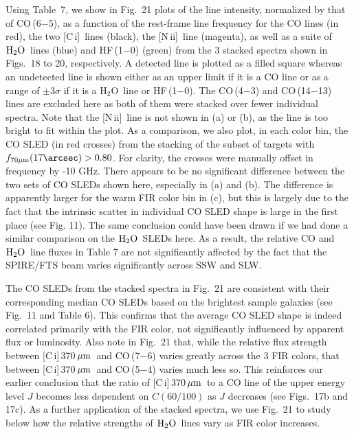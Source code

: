 \documentclass[preprint]{aastex}
\newcommand{\um}{\mbox{$\,\mu{\rm m}$}}
\newcommand{\Water}{\mbox{${\rm H}_2{\rm O}$}}
\newcommand{\CI}{[C\,{\sc i}]}
\newcommand{\NII}{\mbox{[N\,{\sc ii}]}}
\newcommand{\water}{\mbox{H$_2$O}}
\begin{document}
Using Table~7, we show in Fig.~21 plots of the line intensity, normalized by 
that of CO\,(6$-$5), as a function of the rest-frame line frequency for 
the CO lines (in red), the two \CI\ lines (black), the \NII\ line (magenta), 
as well as a suite of \Water\ lines (blue) and HF\,(1$-$0) (green) from 
the 3 stacked spectra shown in Figs.~18 to 20, respectively.  A detected line 
is plotted as a filled square whereas an undetected line is shown either 
as an upper limit if it is a CO line or as a range of $\pm$3$\sigma$ if it is
a \water\ line or HF\,(1$-$0). 
The CO\,(4$-$3) and CO\,(14$-$13) lines are excluded here as both of them were 
stacked over fewer individual spectra.  Note that the \NII\ line is not shown in
(a) or (b), as the line is too bright to fit within the plot. As a comparison,
we also plot, in each color bin, the CO SLED (in red crosses) from the stacking 
of the subset of targets with $f_{70\mu{\rm m}}(17\arcsec) > 0.80$. For clarity, 
the crosses 
were manually offset in frequency by -10 GHz.  There appears to be no significant
difference between the two sets of CO SLEDs shown here, especially in (a) 
and (b).  The difference is apparently larger for the warm FIR color bin 
in (c), but this is largely due to the fact that the intrinsic scatter in 
individual CO SLED shape is large in the first place (see Fig. 11). The same
conclusion could have been drawn if we had done a similar comparison on 
the \Water\ SLEDs here. As a result, the relative CO and \Water\ line fluxes 
in Table 7 are not significantly affected by the fact that the SPIRE/FTS beam
varies significantly across SSW and SLW.


The CO SLEDs from the stacked spectra in Fig.~21 are consistent with their
corresponding median CO SLEDs based on the brightest sample galaxies (see 
Fig.~11 and Table 6).  This confirms that the average CO SLED shape is indeed 
correlated primarily with the FIR color, not significantly influenced by 
apparent flux or luminosity.  Also note in Fig.~21 that, while the relative 
flux strength between \CI\,370\um\ and CO\,(7$-$6) varies greatly across 
the 3 FIR colors, that between \CI\,370\um\ and CO\,(5$-$4) varies much less
so.  This reinforces our earlier conclusion that the ratio of \CI\,370\um\ 
to a CO line of the upper energy level $J$ becomes less dependent on 
$C(60/100)$ as $J$ decreases (see Figs.~17b and 17c).  As a further application
of the stacked spectra, we use Fig.~21 to study below how the relative strengths
of \Water\ lines vary as FIR color increases.
\end{document}
